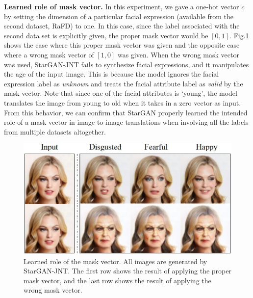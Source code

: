\documentclass[10pt,twocolumn,letterpaper]{article}
\begin{document}
\smallskip

\noindent\textbf{Learned role of mask vector.} In this experiment, we gave a one-hot vector $c$ by setting the dimension of a particular facial expression (available from the second dataset, RaFD) to one. In this case, since the label associated with the second data set is explicitly given, the proper mask vector would be $[0,1]$. Fig.\thinspace\ref{figure7} shows the case where this proper mask vector was given and the opposite case where a wrong mask vector of $[1,0]$ was given. 
When the wrong mask vector was used, StarGAN-JNT fails to synthesize facial expressions, and it manipulates the age of the input image. This is because the model ignores the facial expression label as \textit{unknown} and treats the facial attribute label as \textit{valid} by the mask vector. Note that since one of the facial attributes is `young', the model translates the image from young to old when it takes in a zero vector as input. From this behavior, we can confirm that StarGAN properly learned the intended role of a mask vector in image-to-image translations when involving all the labels from multiple datasets altogether.

\begin{figure}[t]
\centering
\centerline{\includegraphics[width=1.0\linewidth]{images/figure7.jpg}}
\caption{Learned role of the mask vector. All images are generated by StarGAN-JNT. The first row shows the result of applying the proper mask vector, and the last row shows the result of applying the wrong mask vector.}
\label{figure7}
\vspace{-0.1in}
\end{figure}
\end{document}
